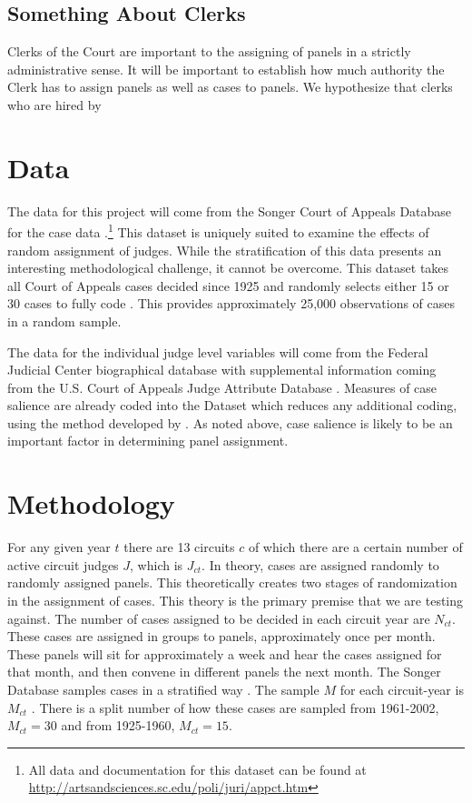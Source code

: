\documentclass[12pt]{article}
\begin{document}
\subsection*{Something About Clerks}
Clerks of the Court are important to the assigning of panels in a strictly administrative sense.  It will be important to establish how much authority the Clerk has to assign panels as well as cases to panels.  We hypothesize that clerks who are hired by 

\section{Data}\label{Data}
The data for this project will come from the Songer Court of Appeals Database for the case data \citep{Songer2007}.\footnote{All data and documentation for this dataset can be found at \url{http://artsandsciences.sc.edu/poli/juri/appct.htm}}  This dataset is uniquely suited to examine the effects of random assignment of judges.  While the stratification of this data presents an interesting methodological challenge, it cannot be overcome.  This dataset takes all Court of Appeals cases decided since 1925 and randomly selects either 15 or 30 cases to fully code \citep{hurwitz2006institutional,hurtwitz2012changes}.  This provides approximately 25,000 observations of cases in a random sample.   

The data for the individual judge level variables will come from the Federal Judicial Center biographical database with supplemental information coming from the U.S. Court of Appeals Judge Attribute Database \citep{FJC}. Measures of case salience are already coded into the \citeauthor{Songer2007} Dataset which reduces any additional coding, using the method developed by \cite{Hettinger2003}.  As noted above, case salience is likely to be an important factor in determining panel assignment.

\section{Methodology}\label{Methods}
For any given year $t$ there are 13 circuits $c$ of which there are a certain number of active circuit judges $J$, which is $J_{ct}$.  In theory, cases are assigned randomly to randomly assigned panels.  This theoretically creates two stages of randomization in the assignment of cases.  This theory is the primary premise that we are testing against.  The number of cases assigned to be decided in each circuit year are $N_{ct}$.  These cases are assigned in groups to panels, approximately once per month.  These panels will sit for approximately a week and hear the cases assigned for that month, and then convene in different panels the next month.  The Songer Database samples cases in a stratified way \citep{Songer2007}.  The sample $M$ for each circuit-year is $M_{ct}$ \citep{Songer2007}.  There is a split number of how these cases are sampled from 1961-2002, $M_{ct}=30$ and from 1925-1960, $M_{ct}=15$.  
\end{document}
